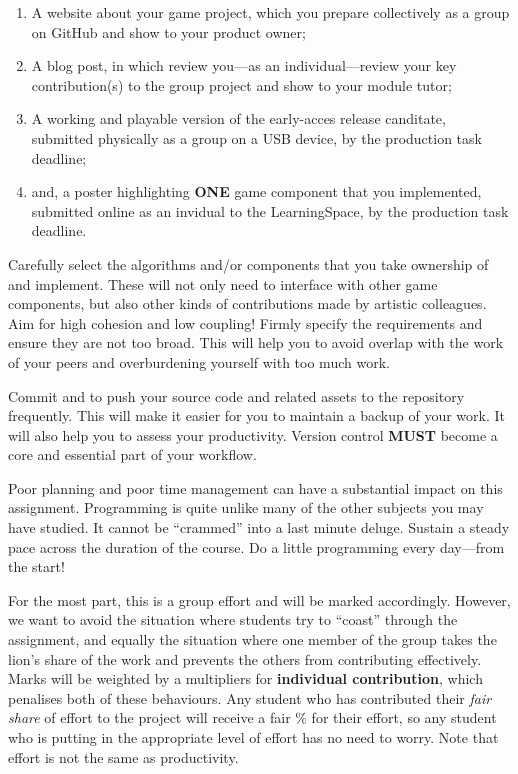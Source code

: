 \documentclass{../../fal_assignment}
\begin{document}
\begin{enumerate}[label=(\roman*)]
	\item A website about your game project, which you prepare collectively as a group on GitHub and show to your product owner;
	\item A blog post, in which review you---as an individual---review your key contribution(s) to the group project and show to your module tutor;
	\item A working and playable version of the early-acces release canditate, submitted physically as a group on a USB device, by the production task deadline;
	\item and, a poster highlighting \textbf{ONE} game component that you implemented, submitted online as an invidual to the LearningSpace, by the production task deadline.
\end{enumerate}

Carefully select the algorithms and/or components that you take ownership of and implement. These will not only need to interface with other game components, but also other kinds of contributions made by artistic colleagues. Aim for high cohesion and low coupling! Firmly specify the requirements and ensure they are not too broad. This will help you to avoid overlap with the work of your peers and overburdening yourself with too much work. 

Commit and to push your source code and related assets to the repository frequently. This will make it easier for you to maintain a backup of your work. It will also help you to assess your productivity. Version control \textbf{MUST} become a core and essential part of your workflow. 

Poor planning and poor time management can have a substantial impact on this assignment. Programming is quite unlike many of the other subjects you may have studied. It cannot be ``crammed'' into a last minute deluge. Sustain a steady pace across the duration of the course. Do a little programming every day---from the start!

For the most part, this is a group effort and will be marked accordingly.
However, we want to avoid the situation where students try to ``coast'' through the assignment,
and equally the situation where one member of the group takes the lion's share of the work
and prevents the others from contributing effectively.
Marks will be weighted by a multipliers for \textbf{individual contribution}, which penalises both of these behaviours.
Any student who has contributed their \textit{fair share} of effort to the project will receive a fair \% for their effort,
so any student who is putting in the appropriate level of effort has no need to worry. Note that effort is not the same as productivity.
\end{document}

